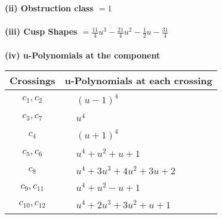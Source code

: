 \documentclass[1p]{elsarticle_modified}
\theoremstyle{definition}
\begin{document}
\flushleft \textbf{(ii) Obstruction class $= 1$}\\~\\
\flushleft \textbf{(iii) Cusp Shapes $= \frac{11}{4} u^3-\frac{21}{4} u^2-\frac{1}{2} u-\frac{31}{4}$}\\~\\
\newpage\renewcommand{\arraystretch}{1}
\flushleft \textbf{(iv) u-Polynomials at the component}\newline \\
\begin{tabular}{m{50pt}|m{274pt}}
Crossings & \hspace{64pt}u-Polynomials at each crossing \\
\hline $$\begin{aligned}c_{1},c_{2}\end{aligned}$$&$\begin{aligned}
&(u-1)^4
\end{aligned}$\\
\hline $$\begin{aligned}c_{3},c_{7}\end{aligned}$$&$\begin{aligned}
&u^4
\end{aligned}$\\
\hline $$\begin{aligned}c_{4}\end{aligned}$$&$\begin{aligned}
&(u+1)^4
\end{aligned}$\\
\hline $$\begin{aligned}c_{5},c_{6}\end{aligned}$$&$\begin{aligned}
&u^4+u^2+u+1
\end{aligned}$\\
\hline $$\begin{aligned}c_{8}\end{aligned}$$&$\begin{aligned}
&u^4+3 u^3+4 u^2+3 u+2
\end{aligned}$\\
\hline $$\begin{aligned}c_{9},c_{11}\end{aligned}$$&$\begin{aligned}
&u^4+u^2- u+1
\end{aligned}$\\
\hline $$\begin{aligned}c_{10},c_{12}\end{aligned}$$&$\begin{aligned}
&u^4+2 u^3+3 u^2+u+1
\end{aligned}$\\
\hline
\end{tabular}\\~\\
\end{document}
